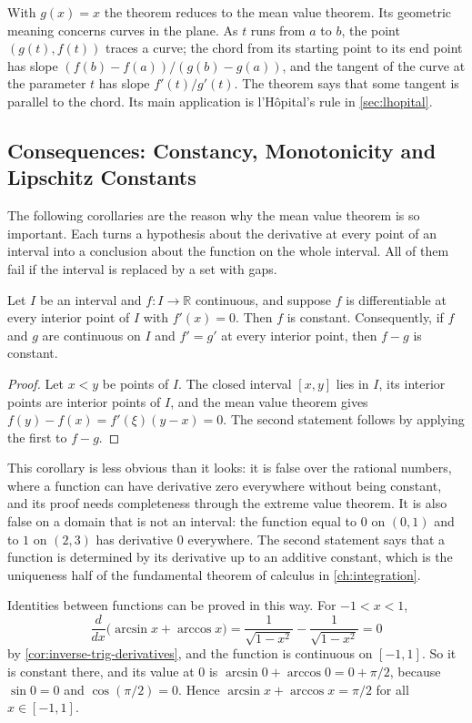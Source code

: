 With $g(x)=x$ the theorem reduces to the mean value theorem. Its geometric meaning concerns curves in the plane. As $t$ runs from $a$ to $b$, the point $(g(t),f(t))$ traces a curve; the chord from its starting point to its end point has slope $(f(b)-f(a))/(g(b)-g(a))$, and the tangent of the curve at the parameter $t$ has slope $f'(t)/g'(t)$. The theorem says that some tangent is parallel to the chord. Its main application is l'H\^opital's rule in \cref{sec:lhopital}.

\subsection{Consequences: Constancy, Monotonicity and Lipschitz Constants}

The following corollaries are the reason why the mean value theorem is so important. Each turns a hypothesis about the derivative at every point of an interval into a conclusion about the function on the whole interval. All of them fail if the interval is replaced by a set with gaps.

\begin{corollary}
\label{cor:zero-derivative}
Let $I$ be an interval and $f\colon I\to\mathbb R$ continuous, and suppose $f$ is differentiable at every interior point of $I$ with $f'(x)=0$. Then $f$ is constant. Consequently, if $f$ and $g$ are continuous on $I$ and $f'=g'$ at every interior point, then $f-g$ is constant.
\end{corollary}

\begin{proof}
Let $x<y$ be points of $I$. The closed interval $[x,y]$ lies in $I$, its interior points are interior points of $I$, and the mean value theorem gives $f(y)-f(x)=f'(\xi)(y-x)=0$. The second statement follows by applying the first to $f-g$.
\end{proof}

This corollary is less obvious than it looks: it is false over the rational numbers, where a function can have derivative zero everywhere without being constant, and its proof needs completeness through the extreme value theorem. It is also false on a domain that is not an interval: the function equal to $0$ on $(0,1)$ and to $1$ on $(2,3)$ has derivative $0$ everywhere. The second statement says that a function is determined by its derivative up to an additive constant, which is the uniqueness half of the fundamental theorem of calculus in \cref{ch:integration}.

Identities between functions can be proved in this way. For $-1<x<1$,
\[
\frac d{dx}\bigl(\arcsin x+\arccos x\bigr)=\frac1{\sqrt{1-x^2}}-\frac1{\sqrt{1-x^2}}=0
\]
by \cref{cor:inverse-trig-derivatives}, and the function is continuous on $[-1,1]$. So it is constant there, and its value at $0$ is $\arcsin0+\arccos0=0+\pi/2$, because $\sin0=0$ and $\cos(\pi/2)=0$. Hence $\arcsin x+\arccos x=\pi/2$ for all $x\in[-1,1]$.

